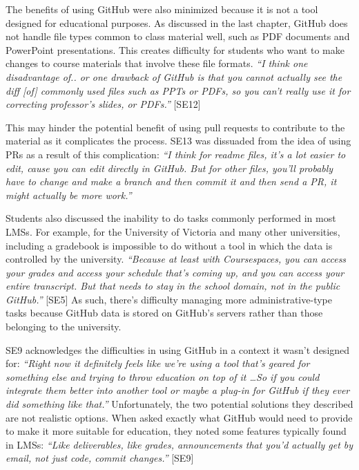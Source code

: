 The benefits of using GitHub were also minimized because it is not a tool designed for educational purposes. As discussed in the last chapter, GitHub does not handle file types common to class material well, such as PDF documents and PowerPoint presentations. This creates difficulty for students who want to make changes to course materials that involve these file formats. \textit{``I think one disadvantage of.. or one drawback of GitHub is that you cannot actually see the diff [of] commonly used files such as PPTs or PDFs, so you can't really use it for correcting professor's slides, or PDFs.''} [SE12]

This may hinder the potential benefit of using pull requests to contribute to the material as it complicates the process. SE13 was dissuaded from the idea of using PRs as a result of this complication: \textit{``I think for readme files, it's a lot easier to edit, cause you can edit directly in GitHub. But for other files, you'll probably have to change and make a branch and then commit it and then send a PR, it might actually be more work.''}

Students also discussed the inability to do tasks commonly performed in most LMSs. For example, for the University of Victoria and many other universities, including a gradebook is impossible to do without a tool in which the data is controlled by the university. \textit{``Because at least with Coursespaces, you can access your grades and access your schedule that's coming up, and you can access your entire transcript. But that needs to stay in the school domain, not in the public GitHub.''} [SE5] As such, there's difficulty managing more administrative-type tasks because GitHub data is stored on GitHub's servers rather than those belonging to the university.


SE9 acknowledges the difficulties in using GitHub in a context it wasn't designed for: \textit{``Right now it definitely feels like we're using a tool that's geared for something else and trying to throw education on top of it \ldots So if you could integrate them better into another tool or maybe a plug-in for GitHub if they ever did something like that.''} Unfortunately, the two potential solutions they described are not realistic options. When asked exactly what GitHub would need to provide to make it more suitable for education, they noted some features typically found in LMSs: \textit{``Like deliverables, like grades, announcements that you'd actually get by email, not just code, commit changes.''} [SE9]

